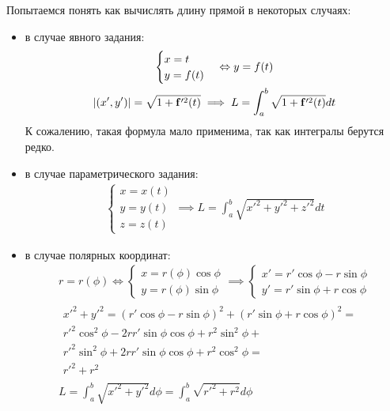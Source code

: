 \documentclass[main]{subfiles}
\begin{document}
\newpage %
Попытаемся понять как вычислять длину прямой в некоторых случаях:
\begin{itemize}
    \item в случае явного задания:
          \begin{gather*}
              \displaystyle \begin{cases}
                  x = t \\
                  y = f(t)
              \end{cases} \Leftrightarrow y = f(t) \\
              |(x',y')|  = \sqrt{1 + \mathbf{f}'^2(t)} \implies
              L = \int_a^b\sqrt{1 + \mathbf{f}'^2(t)} dt
          \end{gather*}
          К сожалению, такая формула мало применима, так как интегралы берутся редко.
    \item в случае параметрического задания:
          \begin{gather*}\begin{cases}
                  x = x(t) \\
                  y = y(t) \\
                  z = z(t)
              \end{cases} \implies
              L = \int_a^b \sqrt{x'^2 + y'^2 +z'^2} dt
          \end{gather*}
    \item в случае полярных координат:
          \begin{gather*}
              r = r(\phi) \Leftrightarrow \begin{cases}
                  x = r(\phi) \cos \phi \\
                  y = r(\phi) \sin \phi
              \end{cases} \implies
              \begin{cases}
                  x' = r' \cos \phi -r \sin \phi \\
                  y' = r' \sin \phi + r \cos \phi
              \end{cases} \\
              \begin{multlined}
                  x'^2 + y'^2 = (r' \cos \phi -r \sin \phi)^2 + (r' \sin \phi + r \cos \phi)^2 = \\
                  r'^2\cos^2 \phi - 2rr'\sin \phi \cos \phi + r^2 \sin^2 \phi +\\
                  r'^2 \sin^2\phi + 2rr' \sin \phi \cos \phi + r^2 \cos^2 \phi = \\
                  r'^2 + r^2
              \end{multlined}\\
              L = \int_a^b \sqrt{x'^2 + y'^2} d\phi  = \int_a^b \sqrt{r'^2 + r^2}d \phi
          \end{gather*}
\end{itemize}
\end{document}
